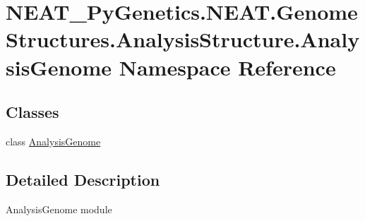 \hypertarget{namespace_n_e_a_t___py_genetics_1_1_n_e_a_t_1_1_genome_structures_1_1_analysis_structure_1_1_analysis_genome}{}\section{N\+E\+A\+T\+\_\+\+Py\+Genetics.\+N\+E\+A\+T.\+Genome\+Structures.\+Analysis\+Structure.\+Analysis\+Genome Namespace Reference}
\label{namespace_n_e_a_t___py_genetics_1_1_n_e_a_t_1_1_genome_structures_1_1_analysis_structure_1_1_analysis_genome}
\subsection*{Classes}
\begin{DoxyCompactItemize}
\item 
class \hyperlink{class_n_e_a_t___py_genetics_1_1_n_e_a_t_1_1_genome_structures_1_1_analysis_structure_1_1_analysis_genome_1_1_analysis_genome}{Analysis\+Genome}
\end{DoxyCompactItemize}


\subsection{Detailed Description}
\begin{DoxyVerb}AnalysisGenome module
\end{DoxyVerb}
 